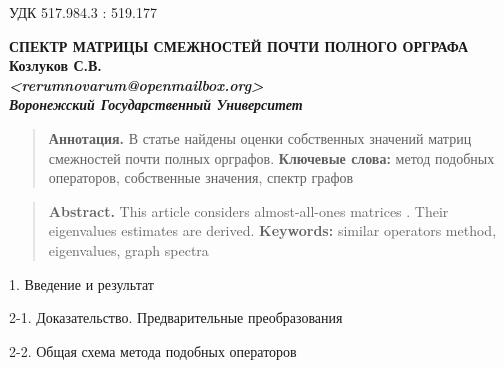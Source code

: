 \documentclass[12pt]{article}
\theoremstyle{definition}
\theoremstyle{plain}
\theoremstyle{remark}
\begin{document}
\setcounter{thm}{0}
\setcounter{lemma}{0}
\quad УДК 517.984.3 : 519.177

\begin{center}
%
\vskip0.5cm
\textbf{СПЕКТР МАТРИЦЫ СМЕЖНОСТЕЙ ПОЧТИ ПОЛНОГО ОРГРАФА}\\
\vskip0.5cm
\textbf{
    \textbf{Козлуков С.В.\footnotemark} \\
    \textit{<rerumnovarum@openmailbox.org>} \\
    \textit{Воронежский Государственный Университет}
}
\end{center}


\begin{quote}
    \small{{\bf Аннотация.}
    В статье найдены оценки собственных значений
    матриц смежностей почти полных орграфов.
    }
    \textbf{Ключевые слова:}
    \small{метод подобных операторов, собственные значения, спектр графов}
\end{quote}

\begin{quote}
    \small{{\bf Abstract.}
    This article considers almost-all-ones matrices
.%
    Their eigenvalues estimates are derived.
    }
    \textbf{Keywords:}
    \small{similar operators method, eigenvalues, graph spectra}
\end{quote}

\begin{center}{1. Введение и результат}\end{center}

\begin{center}{2-1. Доказательство. Предварительные преобразования}\end{center}

\begin{center}{2-2. Общая схема метода подобных операторов}\end{center}



\end{document}
